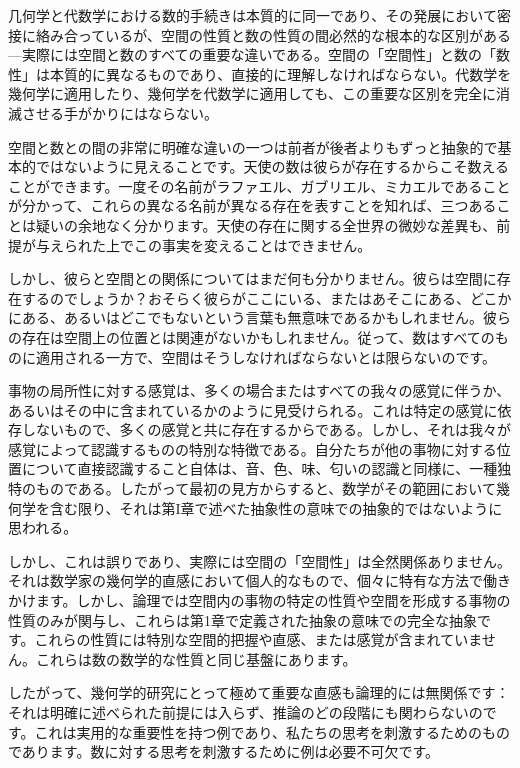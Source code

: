 \documentclass[a4paper,11pt,openany]{ltjsbook}
\begin{document}
几何学と代数学における数的手続きは本質的に同一であり、その発展において密接に絡み合っているが、空間の性質と数の性質の間必然的な根本的な区別がある---実際には空間と数のすべての重要な違いである。空間の「空間性」と数の「数性」は本質的に異なるものであり、直接的に理解しなければならない。代数学を幾何学に適用したり、幾何学を代数学に適用しても、この重要な区別を完全に消滅させる手がかりにはならない。

空間と数との間の非常に明確な違いの一つは前者が後者よりもずっと抽象的で基本的ではないように見えることです。天使の数は彼らが存在するからこそ数えることができます。一度その名前がラファエル、ガブリエル、ミカエルであることが分かって、これらの異なる名前が異なる存在を表すことを知れば、三つあることは疑いの余地なく分かります。天使の存在に関する全世界の微妙な差異も、前提が与えられた上でこの事実を変えることはできません。

しかし、彼らと空間との関係についてはまだ何も分かりません。彼らは空間に存在するのでしょうか？おそらく彼らがここにいる、またはあそこにある、どこかにある、あるいはどこでもないという言葉も無意味であるかもしれません。彼らの存在は空間上の位置とは関連がないかもしれません。従って、数はすべてのものに適用される一方で、空間はそうしなければならないとは限らないのです。

事物の局所性に対する感覚は、多くの場合またはすべての我々の感覚に伴うか、あるいはその中に含まれているかのように見受けられる。これは特定の感覚に依存しないもので、多くの感覚と共に存在するからである。しかし、それは我々が感覚によって認識するものの特別な特徴である。自分たちが他の事物に対する位置について直接認識すること自体は、音、色、味、匂いの認識と同様に、一種独特のものである。したがって最初の見方からすると、数学がその範囲において幾何学を含む限り、それは第I章で述べた抽象性の意味での抽象的ではないように思われる。

しかし、これは誤りであり、実際には空間の「空間性」は全然関係ありません。それは数学家の幾何学的直感において個人的なもので、個々に特有な方法で働きかけます。しかし、論理では空間内の事物の特定の性質や空間を形成する事物の性質のみが関与し、これらは第1章で定義された抽象の意味での完全な抽象です。これらの性質には特別な空間的把握や直感、または感覚が含まれていません。これらは数の数学的な性質と同じ基盤にあります。

したがって、幾何学的研究にとって極めて重要な直感も論理的には無関係です：それは明確に述べられた前提には入らず、推論のどの段階にも関わらないのです。これは実用的な重要性を持つ例であり、私たちの思考を刺激するためのものであります。数に対する思考を刺激するために例は必要不可欠です。
\end{document}
